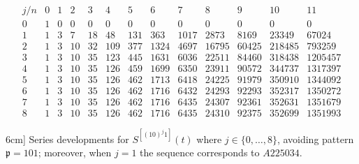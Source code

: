 \begin{table}
\begin{equation*}
\begin{array}{c|cccccccccccc}
    j/n & 0 & 1 & 2 & 3 & 4 & 5 & 6 & 7 & 8 & 9 & 10 & 11\\\hline0 & 1 & 0 & 0 & 0 & 0 & 0 & 0 & 0 & 0 & 0 & 0 & 0\\1 & 1 & 3 & 7 & 18 & 48 & 131 & 363 & 1017 & 2873 & 8169 & 23349 & 67024\\2 & 1 & 3 & 10 & 32 & 109 & 377 & 1324 & 4697 & 16795 & 60425 & 218485 & 793259\\3 & 1 & 3 & 10 & 35 & 123 & 445 & 1631 & 6036 & 22511 & 84460 & 318438 & 1205457\\4 & 1 & 3 & 10 & 35 & 126 & 459 & 1699 & 6350 & 23911 & 90572 & 344737 & 1317397\\5 & 1 & 3 & 10 & 35 & 126 & 462 & 1713 & 6418 & 24225 & 91979 & 350910 & 1344092\\6 & 1 & 3 & 10 & 35 & 126 & 462 & 1716 & 6432 & 24293 & 92293 & 352317 & 1350272\\7 & 1 & 3 & 10 & 35 & 126 & 462 & 1716 & 6435 & 24307 & 92361 & 352631 & 1351679\\8 & 1 & 3 & 10 & 35 & 126 & 462 & 1716 & 6435 & 24310 & 92375 & 352699 & 1351993
\end{array}
\end{equation*}
\caption[Series developments for $S^{[(10)^{j}1]}(t)$ where $j\in \lbrace 0,\ldots,8 \rbrace$.]
        [6cm]{
            Series developments for $S^{[(10)^{j}1]}(t)$ where $j\in \lbrace 0,\ldots,8 \rbrace$,
            avoiding pattern $\mathfrak{p}=101$; moreover,
            when $j=1$ the sequence corresponds to $A225034$.
        }
\label{tbl:S10_j:1}
\end{table}

